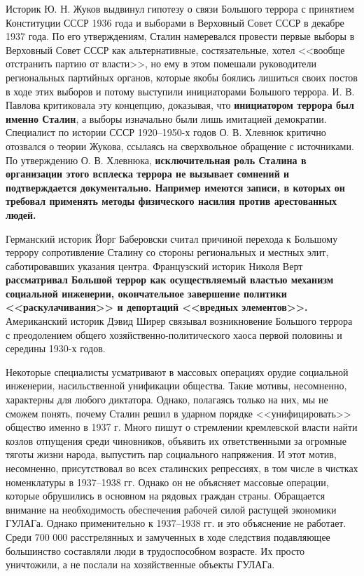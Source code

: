 \documentclass[12pt]{article}
\newcommand{\teal}[1]{{\color{teal}{#1}}}
\begin{document}
  Историк Ю. Н. Жуков выдвинул гипотезу о связи Большого террора с принятием Конституции СССР 1936 года и выборами в Верховный Совет СССР в декабре 1937 года.
  По его утверждениям, Сталин намеревался провести первые выборы в Верховный Совет СССР как альтернативные, состязательные, хотел <<вообще отстранить партию от власти>>, но ему в этом помешали руководители региональных партийных органов, которые якобы боялись лишиться своих постов в ходе этих выборов и потому выступили инициаторами Большого террора.
  И. В. Павлова критиковала эту концепцию, доказывая, что \textbf{инициатором террора был именно Сталин}, а выборы изначально были лишь имитацией демократии.
  Специалист по истории СССР 1920--1950-х годов О. В. Хлевнюк критично отозвался о теории Жукова, ссылаясь на сверхвольное обращение с источниками.
  По утверждению О. В. Хлевнюка, \textbf{исключительная роль Сталина в организации этого всплеска террора не вызывает сомнений и подтверждается документально.
  Например имеются записи, в которых он требовал применять методы физического насилия против арестованных людей.}
  \\ \teal{тут я ещё хотел написать что называть Большой террор ежовщиной немного нечестно.
  массовые репрессии небыли инициативой и виной Ежова и его прислужников.
  Ежов was Just Following Orders и Сталин и его тоже растрелял}

  Германский историк Йорг Баберовски считал причиной перехода к Большому террору сопротивление Сталину со стороны региональных и местных элит, саботировавших указания центра.
  Французский историк Николя Верт \textbf{рассматривал Большой террор как осуществляемый властью механизм социальной инженерии, окончательное завершение политики <<раскулачивания>> и депортаций <<вредных элементов>>.}
  Американский историк Дэвид Ширер связывал возникновение Большого террора с преодолением общего хозяйственно-политического хаоса первой половины и середины 1930-х годов.

  Некоторые специалисты усматривают в массовых операциях орудие социальной инженерии, насильственной унификации общества.
  Такие мотивы, несомненно, характерны для любого диктатора.
  Однако, полагаясь только на них, мы не сможем понять, почему Сталин решил в ударном порядке <<унифицировать>> общество именно в 1937 г.
  Много пишут о стремлении кремлевской власти найти козлов отпущения среди чиновников, объявить их ответственными за огромные тяготы жизни народа, выпустить пар социального напряжения.
  И этот мотив, несомненно, присутствовал во всех сталинских репрессиях, в том числе в чистках номенклатуры в 1937--1938 гг.
  Однако он не объясняет массовые операции, которые обрушились в основном на рядовых граждан страны.
  Обращается внимание на необходимость обеспечения рабочей силой растущей экономики ГУЛАГа.
  Однако применительно к 1937--1938 гг. и это объяснение не работает.
  Среди 700 000 расстрелянных и замученных в ходе следствия подавляющее большинство составляли люди в трудоспособном возрасте.
  Их просто уничтожили, а не послали на хозяйственные объекты ГУЛАГа.
\end{document}
